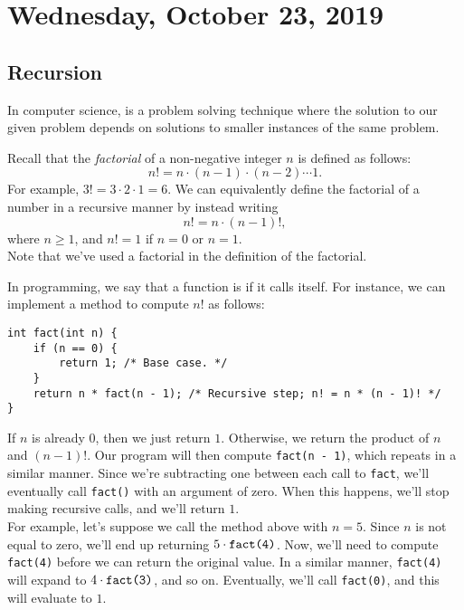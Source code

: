 \section{Wednesday, October 23, 2019}

\subsection{Recursion}

In computer science,  is a problem solving technique where the solution to our given problem depends on solutions to smaller instances of the same problem. 

\begin{example}
[Factorial]
Recall that the \textit{factorial} of a non-negative integer $n$ is defined as follows:
\[
n! = n \cdot (n - 1) \cdot (n - 2) \cdots 1.
\]
For example, $3! = 3 \cdot 2 \cdot 1 = 6$. We can equivalently define the factorial of a number in a recursive manner by instead writing
\[
n! = n \cdot (n - 1)!,
\]
where $n \geq 1$, and $n! = 1$ if $n = 0$ or $n = 1$. \\

\noindent Note that we've used a factorial in the definition of the factorial. 
\end{example}

In programming, we say that a function is  if it calls itself. For instance, we can implement a method to compute $n!$ as follows:

\begin{lstlisting}
int fact(int n) {
    if (n == 0) {
        return 1; /* Base case. */
    }
    return n * fact(n - 1); /* Recursive step; n! = n * (n - 1)! */
}
\end{lstlisting}

If $n$ is already $0$, then we just return $1$. Otherwise, we return the product of $n$ and $(n - 1)!$. Our program will then compute \verb!fact(n - 1)!, which repeats in a similar manner. Since we're subtracting one between each call to \verb!fact!, we'll eventually call \verb!fact()! with an argument of zero. When this happens, we'll stop making recursive calls, and we'll return $1$. \\

For example, let's suppose we call the method above with $n = 5$. Since $n$ is not equal to zero, we'll end up returning $5 \cdot \verb!fact(4)!$. Now, we'll need to compute \verb!fact(4)! before we can return the original value. In a similar manner, \verb!fact(4)! will expand to $4 \cdot \verb!fact(3)!$, and so on. Eventually, we'll call \verb!fact(0)!, and this will evaluate to $1$. \\ 

